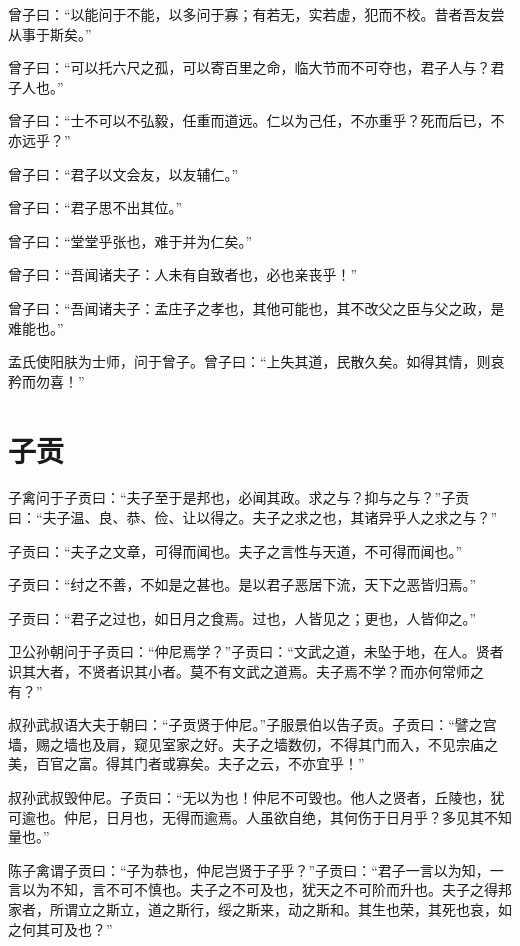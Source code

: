 \documentclass[a5paper]{ctexbook}
\begin{document}
    曾子曰：“以能问于不能，以多问于寡；有若无，实若虚，犯而不校。昔者吾友尝从事于斯矣。”
    
    曾子曰：“可以托六尺之孤，可以寄百里之命，临大节而不可夺也，君子人与？君子人也。”
    
    曾子曰：“士不可以不弘毅，任重而道远。仁以为己任，不亦重乎？死而后已，不亦远乎？”

    曾子曰：“君子以文会友，以友辅仁。”
    
    曾子曰：“君子思不出其位。”

    曾子曰：“堂堂乎张也，难于并为仁矣。”
    
    曾子曰：“吾闻诸夫子：人未有自致者也，必也亲丧乎！”
    
    曾子曰：“吾闻诸夫子：孟庄子之孝也，其他可能也，其不改父之臣与父之政，是难能也。”

    孟氏使阳肤为士师，问于曾子。曾子曰：“上失其道，民散久矣。如得其情，则哀矜而勿喜！”

    \chapter{子贡}

    子禽问于子贡曰：“夫子至于是邦也，必闻其政。求之与？抑与之与？”子贡曰：“夫子温、良、恭、俭、让以得之。夫子之求之也，其诸异乎人之求之与？”

    子贡曰：“夫子之文章，可得而闻也。夫子之言性与天道，不可得而闻也。”

    子贡曰：“纣之不善，不如是之甚也。是以君子恶居下流，天下之恶皆归焉。”
    
    子贡曰：“君子之过也，如日月之食焉。过也，人皆见之；更也，人皆仰之。”
    
    卫公孙朝问于子贡曰：“仲尼焉学？”子贡曰：“文武之道，未坠于地，在人。贤者识其大者，不贤者识其小者。莫不有文武之道焉。夫子焉不学？而亦何常师之有？”

    叔孙武叔语大夫于朝曰：“子贡贤于仲尼。”子服景伯以告子贡。子贡曰：“譬之宫墙，赐之墙也及肩，窥见室家之好。夫子之墙数仞，不得其门而入，不见宗庙之美，百官之富。得其门者或寡矣。夫子之云，不亦宜乎！”

    叔孙武叔毁仲尼。子贡曰：“无以为也！仲尼不可毁也。他人之贤者，丘陵也，犹可逾也。仲尼，日月也，无得而逾焉。人虽欲自绝，其何伤于日月乎？多见其不知量也。”

    陈子禽谓子贡曰：“子为恭也，仲尼岂贤于子乎？”子贡曰：“君子一言以为知，一言以为不知，言不可不慎也。夫子之不可及也，犹天之不可阶而升也。夫子之得邦家者，所谓立之斯立，道之斯行，绥之斯来，动之斯和。其生也荣，其死也哀，如之何其可及也？”
\end{document}
